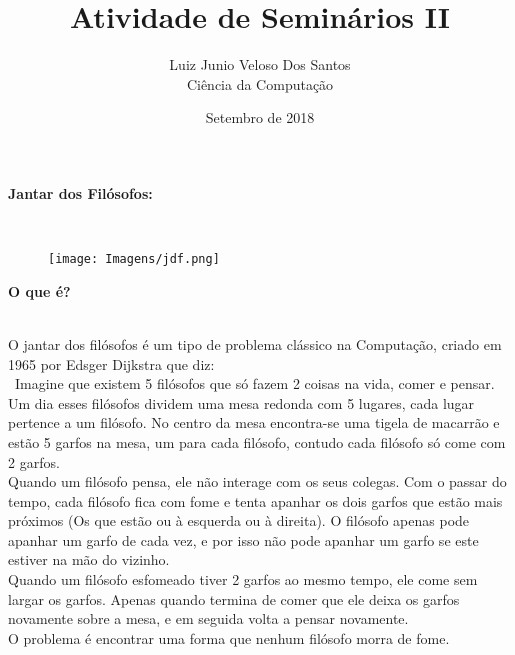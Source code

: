 \documentclass[a4paper, article]{article}
\begin{document}
 
    \title{\vspace{-3cm}Atividade de Seminários II}
    \author{Luiz Junio Veloso Dos Santos\\ Ciência da Computação}
    \date{Setembro de 2018}
    \maketitle

    \begin{enumerate}
        {\large \item \textbf{Jantar dos Filósofos:}}\\
            \begin{figure}[h]
                \centering
                \texttt{[image: Imagens/jdf.png]}
            \end{figure}
            \begin{enumerate}
                {\large \item \textbf{O que é?}}\\
                O jantar dos filósofos é um tipo de problema clássico na Computação, criado
                em 1965 por Edsger Dijkstra que diz:\\
                \
                Imagine que existem 5 filósofos que só fazem 2 coisas na vida, comer e pensar.
                Um dia esses filósofos dividem uma mesa redonda com 5 lugares, cada lugar pertence
                a um filósofo. No centro da mesa encontra-se uma tigela de macarrão e 
                estão 5 garfos na mesa, um para cada filósofo, contudo cada filósofo só come com 2
                garfos.\\
                Quando um filósofo pensa, ele não interage com os seus colegas. Com o passar do tempo,
                cada filósofo fica com fome e tenta apanhar os dois garfos que estão mais próximos
                (Os que estão ou à esquerda ou à direita). O filósofo apenas pode apanhar um garfo
                de cada vez, e por isso não pode apanhar um garfo se este estiver na mão do vizinho.\\
                Quando um filósofo esfomeado tiver 2 garfos ao mesmo tempo, ele come sem largar os garfos.
                Apenas quando termina de comer que ele deixa os garfos novamente sobre a mesa, e em seguida
                volta a pensar novamente.\\ 

                O problema é encontrar uma forma que nenhum filósofo morra de fome.


\end{enumerate}
\end{enumerate}
\end{document}
